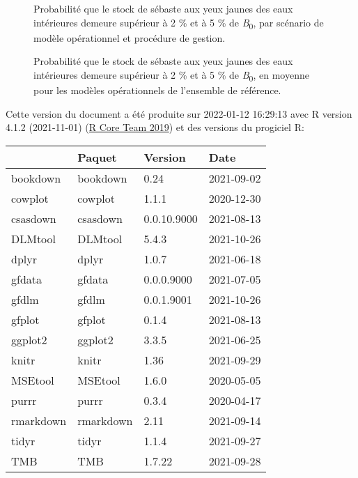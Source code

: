 \documentclass[french,11pt]{book}
\begin{document}
\begin{figure}[htb]

{\centering {} 

}

\caption{Probabilité que le stock de sébaste aux yeux jaunes des eaux intérieures demeure supérieur à 2 \% et à 5 \% de \emph{B}\textsubscript{0}, par scénario de modèle opérationnel et procédure de gestion.}\label{fig:cosewic-all}
\end{figure}
\clearpage


\begin{figure}[htb]

{\centering {} 

}

\caption{Probabilité que le stock de sébaste aux yeux jaunes des eaux intérieures demeure supérieur à 2 \% et à 5 \% de \emph{B}\textsubscript{0}, en moyenne pour les modèles opérationnels de l'ensemble de référence.}\label{fig:cosewic-avg}
\end{figure}
\clearpage


\clearpage

\hypertarget{environnement-informatique}{%
\label{environnement-informatique}}

Cette version du document a été produite sur 2022-01-12 16:29:13 avec R version 4.1.2 (2021-11-01) (\protect\hyperlink{ref-r2019}{R Core Team 2019}) et des versions du progiciel R:
\begin{longtable}[]{@{}llll@{}}
\toprule
& Paquet & Version & Date \\
\midrule
\endhead
bookdown & bookdown & 0.24 & 2021-09-02 \\
cowplot & cowplot & 1.1.1 & 2020-12-30 \\
csasdown & csasdown & 0.0.10.9000 & 2021-08-13 \\
DLMtool & DLMtool & 5.4.3 & 2021-10-26 \\
dplyr & dplyr & 1.0.7 & 2021-06-18 \\
gfdata & gfdata & 0.0.0.9000 & 2021-07-05 \\
gfdlm & gfdlm & 0.0.1.9001 & 2021-10-26 \\
gfplot & gfplot & 0.1.4 & 2021-08-13 \\
ggplot2 & ggplot2 & 3.3.5 & 2021-06-25 \\
knitr & knitr & 1.36 & 2021-09-29 \\
MSEtool & MSEtool & 1.6.0 & 2020-05-05 \\
purrr & purrr & 0.3.4 & 2020-04-17 \\
rmarkdown & rmarkdown & 2.11 & 2021-09-14 \\
tidyr & tidyr & 1.1.4 & 2021-09-27 \\
TMB & TMB & 1.7.22 & 2021-09-28 \\
\bottomrule
\end{longtable}
\vspace{4mm}
\end{document}
